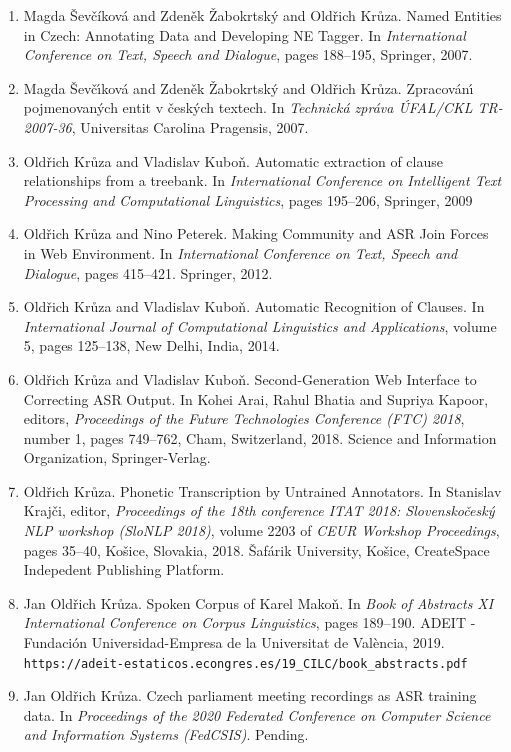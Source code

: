 \documentclass[12pt,a4paper]{report}
\begin{document}
\begin{enumerate}
\item{
  {Magda \v{S}}ev{\v{c}}{\'i}kov{\'a} and Zden{\v{e}}k {\v{Z}}abokrtsk{\'y} and Old{\v{r}}ich Kr{\r{u}}za.
  Named Entities in Czech: Annotating Data and Developing NE Tagger.
  In \textit{International Conference on Text, Speech and Dialogue},
  pages 188--195,
  Springer, 2007.
}
\item{
  Magda {\v{S}}ev{\v{c}}{\'\i}kov{\'a} and Zden{\v{e}}k {\v{Z}}abokrtsk{\'y} and Old{\v{r}}ich Kr\r{u}za.
  Zpracov{\'a}n{\'\i} pojmenovan{\'y}ch entit v {\v{c}}esk{\'y}ch textech.
  In \textit{Technická zpráva ÚFAL/CKL TR-2007-36},
  Universitas Carolina Pragensis, 2007.
}
\item{
  Old{\v{r}}ich Kr\r{u}za and Vladislav Kubo{\v{n}}.
  Automatic extraction of clause relationships from a treebank.
  In \textit{International Conference on Intelligent Text Processing and Computational Linguistics},
  pages 195--206,
  Springer, 2009
}
\item{
  Oldřich Krůza and Nino Peterek.
  Making Community and ASR Join Forces in Web Environment.
  In \textit{International Conference on Text, Speech and Dialogue},
  pages 415--421.
  Springer, 2012.
}
\item{
  Old{\v{r}}ich Kr{\r{u}}za and Vladislav Kubo{\v{n}}.
  Automatic Recognition of Clauses.
  In \textit{International Journal of Computational Linguistics and Applications},
  volume 5,
  pages 125--138,
  New Delhi, India, 2014.
}
\item{
  Oldřich Krůza and Vladislav Kuboň.
  Second-Generation Web Interface to Correcting ASR Output.
  In Kohei Arai, Rahul Bhatia and Supriya Kapoor, editors,
  \textit{Proceedings of the Future Technologies Conference (FTC) 2018},
  number 1, pages 749--762, Cham, Switzerland, 2018.
  Science and Information Organization, Springer-Verlag.
}
\item{
  Oldřich Krůza.
  Phonetic Transcription by Untrained Annotators.
  In Stanislav Krajči, editor,
  \textit{Proceedings of the 18th conference ITAT 2018:
  Slovenskočeský NLP workshop (SloNLP 2018)},
  volume 2203 of \textit{CEUR Workshop Proceedings},
  pages 35--40,
  Košice, Slovakia, 2018.
  Šafárik University, Košice,
  CreateSpace Indepedent Publishing Platform.
}
\item{
  Jan Oldřich Krůza.
  Spoken Corpus of Karel Makoň.  
  In \textit{Book of Abstracts XI International Conference on Corpus Linguistics},
  pages 189--190.
  ADEIT - Fundación Universidad-Empresa de la Universitat de València, 2019.\\
  \texttt{https://adeit-estaticos.econgres.es/19\_CILC/book\_abstracts.pdf}
}
\item{
  Jan Oldřich Krůza.
  Czech parliament meeting recordings as ASR training data.
  In \textit{Proceedings of the 2020 Federated Conference on Computer Science
  and Information Systems (FedCSIS)}.
  Pending.
}
\end{enumerate}
\end{document}

